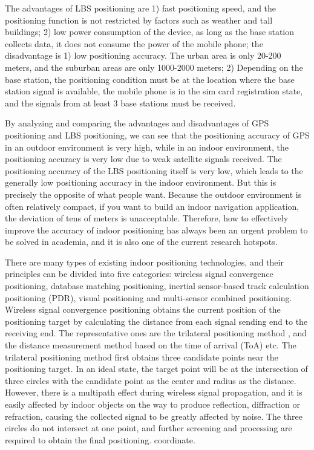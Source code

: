 \documentclass[conference]{IEEEtran}
\begin{document}
The advantages of LBS positioning are 1) fast positioning speed, and the positioning function is not restricted by factors such as weather and tall buildings; 2) low power consumption of the device, as long as the base station collects data, it does not consume the power of the mobile phone; the disadvantage is 1) low positioning accuracy. The urban area is only 20-200 meters, and the suburban areas are only 1000-2000 meters; 2) Depending on the base station, the positioning condition must be at the location where the base station signal is available, the mobile phone is in the sim card registration state, and the signals from at least 3 base stations must be received.

By analyzing and comparing the advantages and disadvantages of GPS positioning and LBS positioning, we can see that the positioning accuracy of GPS in an outdoor environment is very high, while in an indoor environment, the positioning accuracy is very low due to weak satellite signals received. The positioning accuracy of the LBS positioning itself is very low, which leads to the generally low positioning accuracy in the indoor environment. But this is precisely the opposite of what people want. Because the outdoor environment is often relatively compact, if you want to build an indoor navigation application, the deviation of tens of meters is unacceptable. \cite{indoor-precision} Therefore, how to effectively improve the accuracy of indoor positioning has always been an urgent problem to be solved in academia, and it is also one of the current research hotspots.

There are many types of existing indoor positioning technologies, and their principles can be divided into five categories: wireless signal convergence positioning, database matching positioning, inertial sensor-based track calculation positioning (PDR), visual positioning and multi-sensor combined positioning. Wireless signal convergence positioning obtains the current position of the positioning target by calculating the distance from each signal sending end to the receiving end. The representative ones are the trilateral positioning method \cite{indoor-3edges}, and the distance measurement method based on the time of arrival (ToA)\cite {indoor-toa} etc. The trilateral positioning method first obtains three candidate points near the positioning target. In an ideal state, the target point will be at the intersection of three circles with the candidate point as the center and radius as the distance. However, there is a multipath effect during wireless signal propagation, and it is easily affected by indoor objects on the way to produce reflection, diffraction or refraction, causing the collected signal to be greatly affected by noise. The three circles do not intersect at one point, and further screening and processing are required to obtain the final positioning. coordinate.
\end{document}
